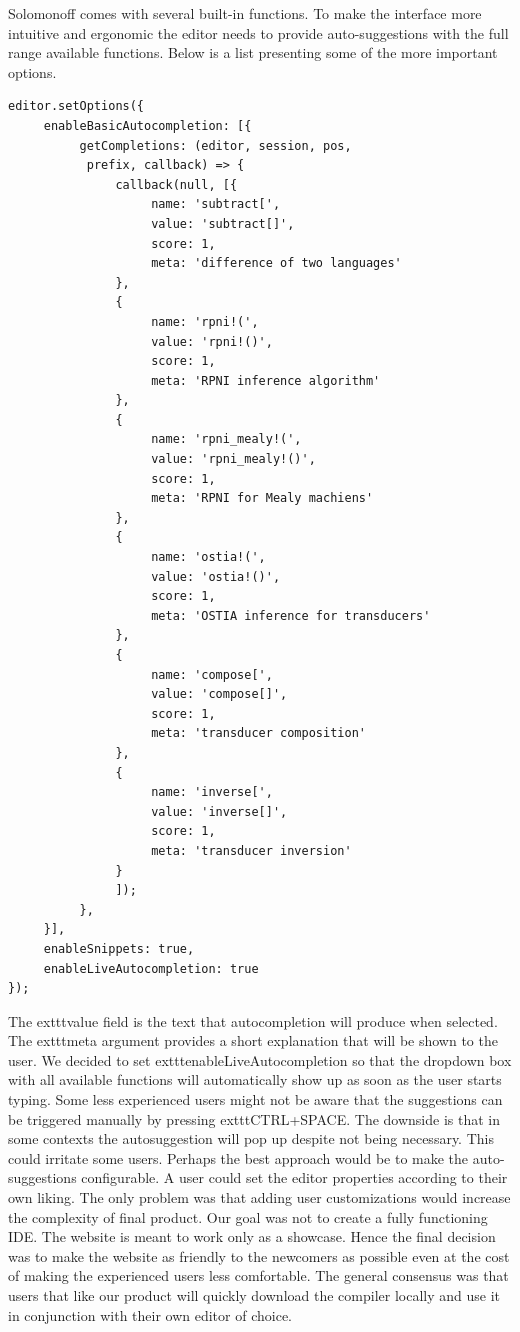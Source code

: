 Solomonoff comes with several built-in functions. To make the interface more intuitive and ergonomic the editor needs to provide auto-suggestions with the full range available functions. Below is a list presenting some of the more important options.
\begin{lstlisting}
editor.setOptions({
     enableBasicAutocompletion: [{
          getCompletions: (editor, session, pos,
           prefix, callback) => {
               callback(null, [{
                    name: 'subtract[',
                    value: 'subtract[]',
                    score: 1,
                    meta: 'difference of two languages'
               },
               {
                    name: 'rpni!(',
                    value: 'rpni!()',
                    score: 1,
                    meta: 'RPNI inference algorithm'
               },
               {
                    name: 'rpni_mealy!(',
                    value: 'rpni_mealy!()',
                    score: 1,
                    meta: 'RPNI for Mealy machiens'
               },
               {
                    name: 'ostia!(',
                    value: 'ostia!()',
                    score: 1,
                    meta: 'OSTIA inference for transducers'
               },
               {
                    name: 'compose[',
                    value: 'compose[]',
                    score: 1,
                    meta: 'transducer composition'
               },
               {
                    name: 'inverse[',
                    value: 'inverse[]',
                    score: 1,
                    meta: 'transducer inversion'
               }
               ]);
          },
     }],
     enableSnippets: true,
     enableLiveAutocompletion: true
});
\end{lstlisting}
The     exttt{value} field is the text that autocompletion will produce when selected. The     exttt{meta} argument provides a short explanation that will be shown to the user. We decided to set     exttt{enableLiveAutocompletion} so that the dropdown box with all available functions will automatically show up as soon as the user starts typing. Some less experienced users might not be aware that the suggestions can be triggered manually by pressing     exttt{CTRL+SPACE}. The downside is that in some contexts the autosuggestion will pop up  despite not being necessary. This could irritate some users. Perhaps the best approach would be to make the auto-suggestions configurable. A user could set the editor properties according to their own liking. The only problem was that adding user customizations would increase the complexity of final product. Our goal was not to create a fully functioning IDE. The website is meant to work only as a showcase. Hence the final decision was to make the website as friendly to the newcomers as possible even at the cost of making the experienced users less comfortable. The general consensus was that users that like our product will quickly download the compiler locally and use it in conjunction with their own editor of choice. 

